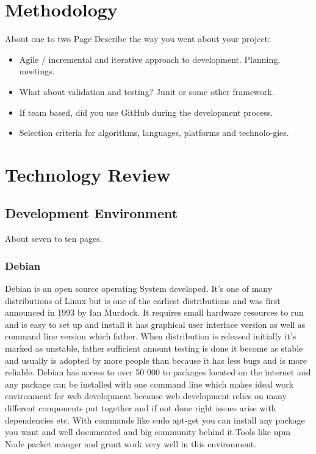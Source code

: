\chapter{Methodology}
About one to two Page
Describe the way you went about your project:
\begin{itemize}
\item Agile / incremental and iterative approach to development. Planning, meetings.
\item What about validation and testing? Junit or some other framework.
\item If team based, did you use GitHub during the development process.
\item Selection criteria for algorithms, languages, platforms and technolo-gies.
\end{itemize}



\chapter{Technology Review}
\section{Development Environment}
About seven to ten pages.
\subsection{Debian}
Debian is an open source operating System developed. It’s one of many distributions of Linux but is one of the earliest distributions and was first announced in 1993 by Ian Murdock. It requires small hardware resources to run and is easy to set up and install it has graphical user interface version as well as command line version which father. When distribution is released initially it’s marked as unstable, father sufficient amount testing is done it become as stable and usually is adopted by more people than because it has less bugs and is more reliable. Debian has access to over 50 000 to packages located on the internet and any package can be installed with one command line which makes ideal work environment for web development because web development relies on many different components put together and if not done right issues arise with dependencies etc. With commands like sudo apt-get you can install any package you want and well documented and big community behind it.Tools like npm Node packet manger and grunt work very well in this environment.

